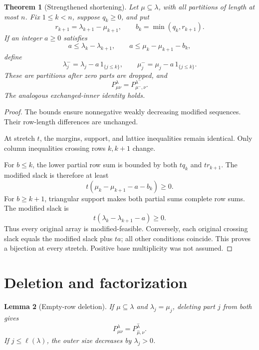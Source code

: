 \documentclass[11pt]{article}
\newtheorem{theorem}{Theorem}
\newtheorem{lemma}[theorem]{Lemma}
\begin{document}
\begin{theorem}[Strengthened shortening]\label{thm:shortening}
Let \(\mu\subseteq\lambda\), with all partitions of length at most \(n\). Fix \(1\le k<n\), suppose \(q_k\ge0\), and put
\[
r_{k+1}=\lambda_{k+1}-\mu_{k+1},\qquad
b_k=\min(q_k,r_{k+1}).
\]
If an integer \(a\ge0\) satisfies
\[
a\le\lambda_k-\lambda_{k+1},\qquad
a\le\mu_k-\mu_{k+1}-b_k,
                                                               \tag{6}
\]
define
\[
\lambda^-_j=\lambda_j-a\,1_{\{j\le k\}},\qquad
\mu^-_j=\mu_j-a\,1_{\{j\le k\}}.
\]
These are partitions after zero parts are dropped, and
\[
P^\lambda_{\mu\nu}=P^{\lambda^-}_{\mu^-,\nu}.
                                                               \tag{7}
\]
The analogous exchanged-inner identity holds.
\end{theorem}

\begin{proof}
The bounds ensure nonnegative weakly decreasing modified sequences. Their row-length differences are unchanged.

At stretch \(t\), the margins, support, and lattice inequalities remain identical. Only column inequalities crossing rows \(k,k+1\) change.

For \(b\le k\), the lower partial row sum is bounded by both \(tq_k\) and \(tr_{k+1}\). The modified slack is therefore at least
\[
t(\mu_k-\mu_{k+1}-a-b_k)\ge0.
\]
For \(b\ge k+1\), triangular support makes both partial sums complete row sums. The modified slack is
\[
t(\lambda_k-\lambda_{k+1}-a)\ge0.
\]
Thus every original array is modified-feasible. Conversely, each original crossing slack equals the modified slack plus \(ta\); all other conditions coincide. This proves a bijection at every stretch. Positive base multiplicity was not assumed.
\end{proof}

\section{Deletion and factorization}

\begin{lemma}[Empty-row deletion]\label{lem:emptyrow}
If \(\mu\subseteq\lambda\) and \(\lambda_j=\mu_j\), deleting part \(j\) from both gives
\[
P^\lambda_{\mu\nu}
=
P^{\widehat\lambda}_{\widehat\mu,\nu}.
                                                               \tag{8}
\]
If \(j\le\ell(\lambda)\), the outer size decreases by \(\lambda_j>0\).
\end{lemma}
\end{document}
